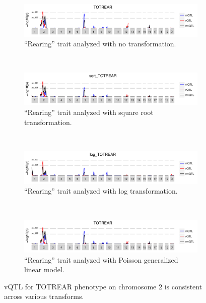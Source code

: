         \FloatBarrier
        \clearpage
        \begin{figure}[h]
            \centering
            \begin{subfigure}{0.9\textwidth}
                \includegraphics[width=\textwidth]{images/TOTREAR_no_transform.pdf}
                \caption{``Rearing'' trait analyzed with no transformation.}
                \label{fig:Bailey_totrear_id}
            \end{subfigure}\\
            \begin{subfigure}{0.9\textwidth}
                \includegraphics[width=\textwidth]{images/TOTREAR_sqrt.pdf}
                \caption{``Rearing'' trait analyzed with square root transformation.}
                \label{fig:Bailey_totrear_squareroot}
            \end{subfigure}\\
            \begin{subfigure}{0.9\textwidth}
                \includegraphics[width=\textwidth]{images/TOTREAR_log.pdf}
                \caption{``Rearing'' trait analyzed with log transformation.}
                \label{fig:Bailey_totrear_log}
            \end{subfigure}\\
            \begin{subfigure}{0.9\textwidth}
                \includegraphics[width=\textwidth]{images/TOTREAR_poisson.pdf}
                \caption{``Rearing'' trait analyzed with Poisson generalized linear model.}
                \label{fig:Bailey_totrear_poisson}
            \end{subfigure}
            \caption{vQTL for TOTREAR phenotype on chromosome 2 is consistent across various transforms.}
            \label{fig:Bailey_totrear_transforms}           
        \end{figure}
